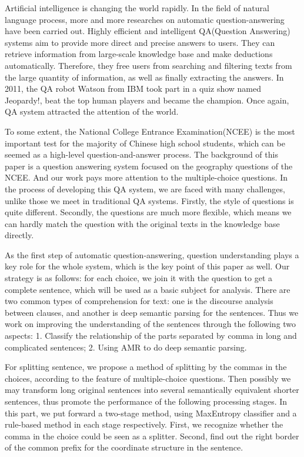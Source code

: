 \documentclass[master, winfont]{njuthesis}
\begin{document}
\begin{englishabstract}
Artificial intelligence is changing the world rapidly. In the field of natural language process, more and more researches on automatic question-answering have been carried out. Highly efficient and intelligent QA(Question Answering) systems aim to provide more direct and precise answers to users. They can retrieve information from large-scale knowledge base and make deductions automatically. Therefore, they free users from searching and filtering texts from the large quantity of information, as well as finally extracting the answers. In 2011, the QA robot Watson from IBM took part in a quiz show named Jeopardy!, beat the top human players and became the champion. Once again, QA system attracted the attention of the world.

To some extent, the National College Entrance Examination(NCEE) is the most important test for the majority of Chinese high school students, which can be seemed as a high-level question-and-answer process. The background of this paper is a question answering system focused on the geography questions of the NCEE. And our work pays more attention to the multiple-choice questions. In the process of developing this QA system, we are faced with many challenges, unlike those we meet in traditional QA systems. Firstly, the style of questions is quite different. Secondly, the questions are much more flexible, which means we can hardly match the question with the original texts in the knowledge base directly.

As the first step of automatic question-answering, question understanding plays a key role for the whole system, which is the key point of this paper as well. Our strategy is as follows: for each choice, we join it with the question to get a complete sentence, which will be used as a basic subject for analysis. There are two common types of comprehension for text: one is the discourse analysis between clauses, and another is deep semantic parsing for the sentences. Thus we work on improving the understanding of the sentences through the following two aspects: 1. Classify the relationship of the parts separated by comma in long and complicated sentences; 2. Using AMR to do deep semantic parsing. 

For splitting sentence, we propose a method of splitting by the commas in the choices, according to the feature of multiple-choice questions. Then possibly we may transform long original sentences into several semantically equivalent shorter sentences, thus promote the performance of the following processing stages. In this part, we put forward a two-stage method, using MaxEntropy classifier and a rule-based method in each stage respectively. First, we recognize whether the comma in the choice could be seen as a splitter. Second, find out the right border of the common prefix for the coordinate structure in the sentence.


\end{englishabstract}
\end{document}

